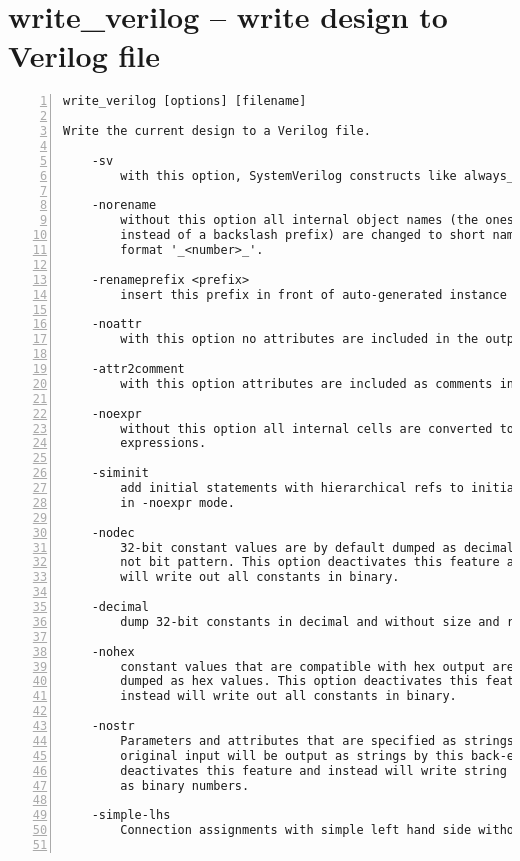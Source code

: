 \section{write\_verilog -- write design to Verilog file}
\label{cmd:write_verilog}
\begin{lstlisting}[numbers=left,frame=single]
    write_verilog [options] [filename]

Write the current design to a Verilog file.

    -sv
        with this option, SystemVerilog constructs like always_comb are used

    -norename
        without this option all internal object names (the ones with a dollar
        instead of a backslash prefix) are changed to short names in the
        format '_<number>_'.

    -renameprefix <prefix>
        insert this prefix in front of auto-generated instance names

    -noattr
        with this option no attributes are included in the output

    -attr2comment
        with this option attributes are included as comments in the output

    -noexpr
        without this option all internal cells are converted to Verilog
        expressions.

    -siminit
        add initial statements with hierarchical refs to initialize FFs when
        in -noexpr mode.

    -nodec
        32-bit constant values are by default dumped as decimal numbers,
        not bit pattern. This option deactivates this feature and instead
        will write out all constants in binary.

    -decimal
        dump 32-bit constants in decimal and without size and radix

    -nohex
        constant values that are compatible with hex output are usually
        dumped as hex values. This option deactivates this feature and
        instead will write out all constants in binary.

    -nostr
        Parameters and attributes that are specified as strings in the
        original input will be output as strings by this back-end. This
        deactivates this feature and instead will write string constants
        as binary numbers.

    -simple-lhs
        Connection assignments with simple left hand side without concatenations.


\end{lstlisting}
